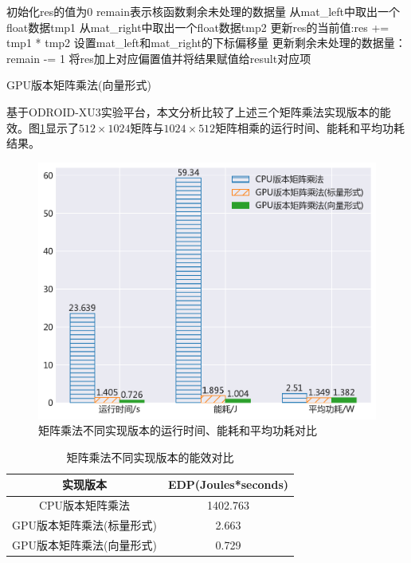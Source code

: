 \begin{algorithm}[htbp]
  \small
  \SetAlgoLined
    \begin{spacing}{0.9}
    初始化res的值为0\;
    remain表示核函数剩余未处理的数据量\;
     {
        从mat\_left中取出一个float数据tmp1\;
        从mat\_right中取出一个float数据tmp2\;
        更新res的当前值:res += tmp1 * tmp2\;
        设置mat\_left和mat\_right的下标偏移量\;
        更新剩余未处理的数据量：remain -= 1\;
    }
    将res加上对应偏置值并将结果赋值给result对应项\;
    \end{spacing}
  \caption{GPU版本矩阵乘法(向量形式)}
  \label{algo:algorithm3}
\end{algorithm}

基于ODROID-XU3实验平台，本文分析比较了上述三个矩阵乘法实现版本的能效。图\ref{figure:figure9}显示了$512\times1024$矩阵与$1024\times512$矩阵相乘的运行时间、能耗和平均功耗结果。

\begin{figure}[htbp]
    \begin{center}
    \includegraphics[height=0.4\textwidth]{figures/matmul.pdf}
    \end{center}
    \caption{矩阵乘法不同实现版本的运行时间、能耗和平均功耗对比}\label{figure:figure9}
\end{figure}

\begin{table}[htbp]
  \centering
  \caption{矩阵乘法不同实现版本的能效对比}
  \label{table:table1}
  \begin{tabular}{cc}
    \toprule
      实现版本 & EDP(Joules*seconds) \\
    \midrule
      CPU版本矩阵乘法 & 1402.763 \\
      GPU版本矩阵乘法(标量形式) & 2.663 \\
      GPU版本矩阵乘法(向量形式) & 0.729 \\
    \bottomrule
  \end{tabular}
\end{table}

